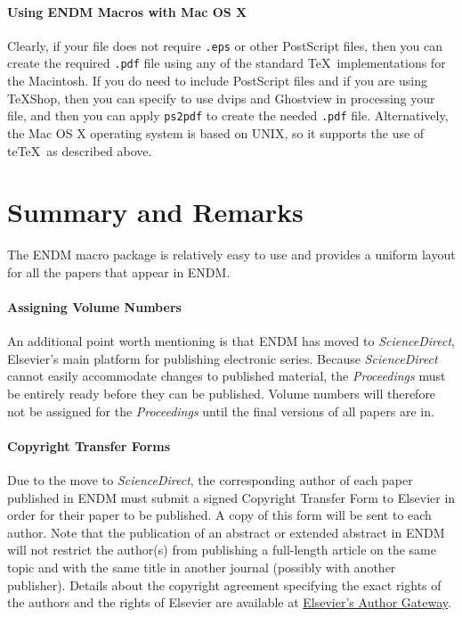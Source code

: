 \documentclass{endm}
\begin{document}
\paragraph{Using ENDM Macros with Mac OS X}

Clearly, if your file does not require \texttt{.eps} or other
PostScript files, then you can create the required \texttt{.pdf} file
using any of the standard \TeX\ implementations for the Macintosh. If
you do need to include PostScript files and if you are using \TeX Shop,
then you can specify to use dvips and Ghostview in processing your
file, and then you can apply \texttt{ps2pdf} to create the needed
\texttt{.pdf} file. Alternatively, the Mac OS X operating system is
based on UNIX, so it supports the use of te\TeX\ as described above.


\section{Summary and Remarks}

The ENDM macro package is relatively easy to use and provides a
uniform layout for all the papers that appear in ENDM.

\paragraph{Assigning Volume Numbers}

An additional point worth mentioning is that ENDM has moved to
\emph{ScienceDirect}, Elsevier's main platform for publishing
electronic series. Because \emph{ScienceDirect} cannot easily
accommodate changes to published material, the \emph{Proceedings}
must be entirely ready before they can be published. Volume numbers
will therefore not be assigned for the \emph{Proceedings} until the
final versions of all papers are in.

\paragraph{Copyright Transfer Forms}

Due to the move to \emph{ScienceDirect}, the corresponding author of
each paper published in ENDM must submit a signed Copyright Transfer
Form to Elsevier in order for their paper to be published. A copy of
this form will be sent to each author. Note that the publication of
an abstract or extended abstract in ENDM will not restrict the
author(s) from publishing a full-length article on the same topic and
with the same title in another journal (possibly with another
publisher). Details about the copyright agreement specifying the exact
rights of the authors and the rights of Elsevier are available at
\href{http://authors.elsevier.com/PublisherInfoDetail.html?dc=AGI}
{Elsevier's Author Gateway}.
\end{document}
